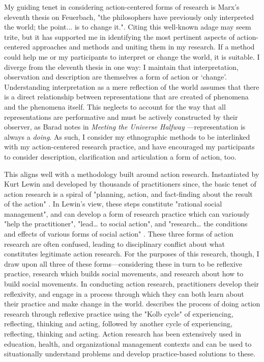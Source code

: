 My guiding tenet in considering action-centered forms of research is Marx's \citeyearpar[p. 173]{marx_selected_2000} eleventh thesis on Feuerbach, "the philosophers have previously only interpreted the world; the point... is to change it.". Citing this well-known adage may seem trite, but it has supported me in identifying the most pertinent aspects of action-centered approaches and methods and uniting them in my research. If a method could help me or my participants to interpret or change the world, it is suitable. I diverge from the eleventh thesis in one way: I maintain that interpretation, observation and description are themselves a form of action or `change'. Understanding interpretation as a mere reflection of the world assumes that there is a direct relationship between representations that are created of phenomena and the phenomena itself. This neglects to account for the way that all representations are performative and must be actively constructed by their observer, as Barad notes in \textit{Meeting the Universe Halfway} \citep{barad_meeting_2007}—representation is always a \textit{doing}. As such, I consider my ethnographic methods to be interlinked with my action-centered research practice, and have encouraged my participants to consider description, clarification and articulation a form of action, too.

This aligns well with a methodology built around action research. Instantiated by Kurt Lewin and developed by thousands of practitioners since, the basic tenet of action research is a spiral of "planning, action, and fact-finding about the result of the action" \citeyearpar[p. 38]{lewin_action_1946}. In Lewin’s view, these steps constitute "rational social management", and can develop a form of research practice which can variously "help the practitioner", "lead… to social action", and "research… the conditions and effects of various forms of social action" \citeyearpar[pp. 34–35]{lewin_action_1946}. These three forms of action research are often confused, leading to disciplinary conflict about what constitutes legitimate action research. For the purposes of this research, though, I draw upon all three of these forms—considering these in turn to be reflexive practice, research which builds social movements, and research about how to build social movements. In conducting action research, practitioners develop their reflexivity, and engage in a process through which they can both learn about their practice and make change in the world. \citet{burns_applying_2017} describes the process of doing action research through reflexive practice using the "Kolb cycle" of experiencing, reflecting, thinking and acting, followed by another cycle of experiencing, reflecting, thinking and acting. Action research has been extensively used in education, health, and organizational management contexts and can be used to situationally understand problems and develop practice-based solutions to these.

